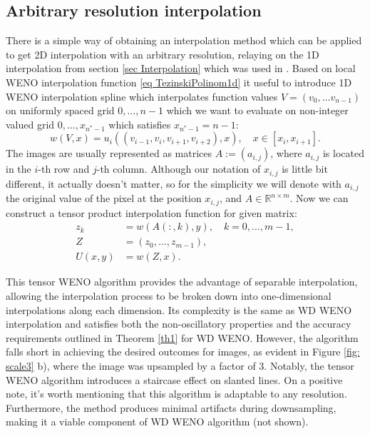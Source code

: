 \subsection{Arbitrary resolution interpolation} \label{sec: Phase3}
There is a simple way of obtaining an interpolation method which can be applied to get 2D interpolation with an arbitrary resolution, relaying on the 1D interpolation from  section \ref{sec Interpolation} which was used in \cite{Mulet_2010}. 
Based on local WENO interpolation function \eqref{eq TezinskiPolinom1d} it useful to introduce 1D WENO interpolation spline which interpolates function values $V= (v_0,\ldots v_{n-1})$ on uniformly spaced grid $0,\ldots,n-1$ which we want to evaluate on non-integer valued grid $0,\ldots, x_{n^*-1}$ which satisfies $x_{n^*-1}=n-1$:
$$ \label{eq wenoSpline}
w(V,x)=u_i((v_{i-1},v_i,v_{i+1},v_{i+2}),x), \quad x\in[x_i,x_{i+1}]. %
$$ 
The images are usually represented as matrices $A:=(a_{i,j})$, where $a_{i,j}$ is located in the $i$-th row and $j$-th column. Although our notation of $x_{i,j}$ is little bit different, it actually doesn't matter, so for the simplicity we will denote with $a_{i,j}$ the original value of the pixel at the position $x_{i,j}$, and $A\in\mathbb{R}^{n\times m}$. Now we can construct a tensor product interpolation function for given matrix:
\begin{equation}
\begin{aligned}	
	z_k&=w(A(:,k),y), \quad k=0,\ldots,m-1,\\
	Z&=(z_0,\dots,z_{m-1}),\\
	U(x,y)&=w(Z,x).
	\label{eq: tensor}
\end{aligned}	
\end{equation}

This tensor WENO algorithm provides the advantage of separable interpolation, allowing the interpolation process to be broken down into one-dimensional interpolations along each dimension. 
Its complexity is the same as {WD} WENO interpolation and satisfies both the non-oscillatory properties and the accuracy requirements outlined in Theorem \ref{th1} for {WD} WENO. 
However, the algorithm falls short in achieving the desired outcomes for images, as evident in Figure \ref{fig: scale3} b), where the image was upsampled by a factor of $3$. 
Notably, the tensor WENO algorithm introduces a staircase effect on slanted lines. 
On a positive note, it's worth mentioning that this algorithm is adaptable to any resolution. 
Furthermore, the method produces minimal artifacts during downsampling, making it a viable component of {WD} WENO algorithm (not shown).

